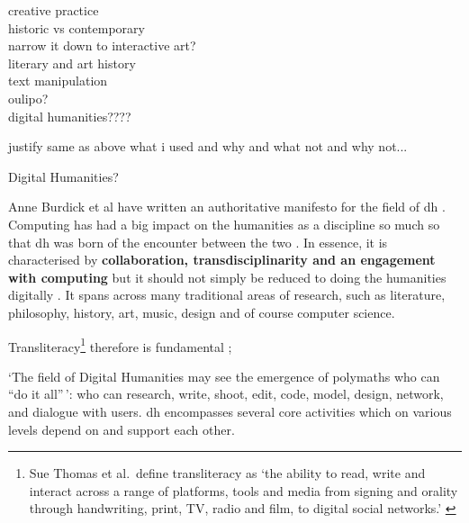 \begin{draft}
  creative practice\\
  historic vs contemporary\\
  narrow it down to interactive art?\\
  literary and art history\\
  text manipulation\\
  oulipo?\\
  digital humanities????

  justify same as above what i used and why and what not and why not...
\end{draft}

Digital Humanities?

\begin{draft}
  Anne Burdick et al have written an authoritative manifesto for the field of \gls{dh} \citeyear{Burdick2012}. Computing has had a big impact on the humanities as a discipline so much so that \gls{dh} was born of the encounter between the two \autocite[p.3]{Burdick2012}. In essence, it is characterised by \textbf{collaboration, transdisciplinarity and an engagement with computing} \autocite[p.122]{Burdick2012} but it should not simply be reduced to doing the humanities digitally \autocite[p.101]{Burdick2012}. It spans across many traditional areas of research, such as literature, philosophy, history, art, music, design and of course computer science.

  \begin{draft}
    Transliteracy\footnote{Sue Thomas et al.\ define transliteracy as `the ability to read, write and interact across a range of platforms, tools and media from signing and orality through handwriting, print, TV, radio and film, to digital social networks.' \autocite{Thomas2007}} therefore is fundamental \autocite{Thomas2007};
  \end{draft}

  `The field of Digital Humanities may see the emergence of polymaths who can ``do it all''\,': who can research, write, shoot, edit, code, model, design, network, and dialogue with users. \autocite[p.15]{Burdick2012} \gls{dh} encompasses several core activities which on various levels depend on and support each other.


\end{draft}
